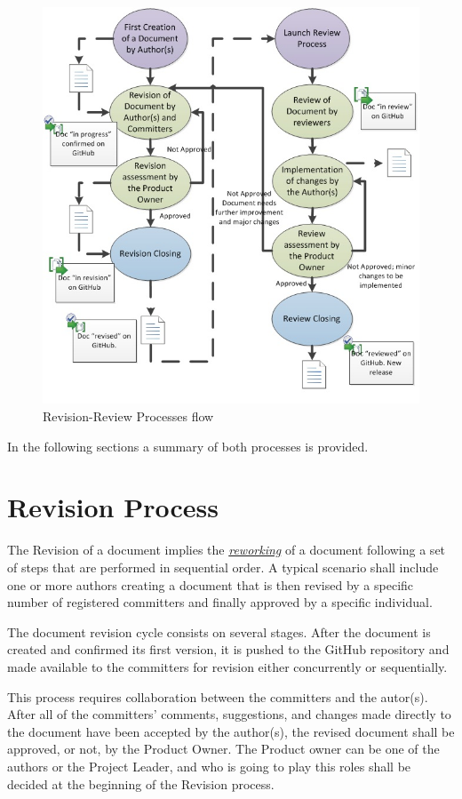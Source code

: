 \documentclass{template/openetcs_article}
\begin{document}
\begin{figure}[H]
\centering
\includegraphics{./figures/RevisionReviewProcess.JPG}
\caption{Revision-Review Processes flow}
\end{figure}

In the following sections a summary of both processes is provided. 

\section{Revision Process}
The Revision of a document implies the {\it\underline{reworking}} of a document following a set of steps that are performed in sequential order. A typical scenario shall include one or more authors creating a document that is then revised by a specific number of registered committers and finally approved by a specific individual.

The document revision cycle consists on several stages. After the document is created and confirmed its first version, it is pushed to the GitHub repository and made available to the committers for revision either concurrently or sequentially. 

This process requires collaboration between the committers and the autor(s). After all of the committers’ comments, suggestions, and changes made directly to the document have been accepted by the author(s), the revised document shall be approved, or not, by the Product Owner. The Product owner can be one of the authors or the Project Leader, and who is going to play this roles shall be decided at the beginning of the Revision process. 
\end{document}
